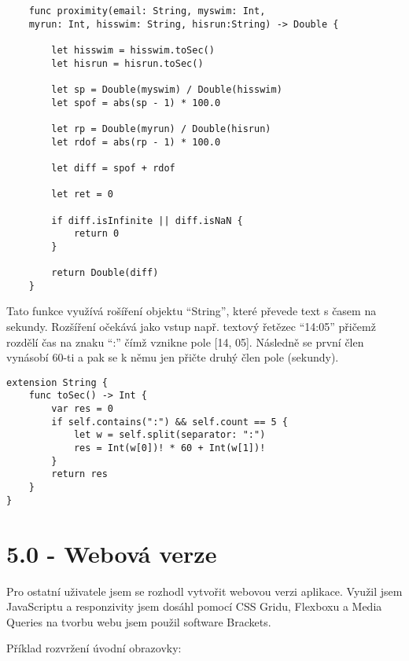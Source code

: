 \documentclass{article}
\begin{document}
\vspace{10 mm}
  \begin{verbatim}
    func proximity(email: String, myswim: Int,
    myrun: Int, hisswim: String, hisrun:String) -> Double {
        
        let hisswim = hisswim.toSec()
        let hisrun = hisrun.toSec()
        
        let sp = Double(myswim) / Double(hisswim)       
        let spof = abs(sp - 1) * 100.0
        
        let rp = Double(myrun) / Double(hisrun)
        let rdof = abs(rp - 1) * 100.0
        
        let diff = spof + rdof
        
        let ret = 0
        
        if diff.isInfinite || diff.isNaN {
            return 0
        }
        
        return Double(diff)
    }
 \end{verbatim}

\vspace{10 mm}
Tato funkce využívá rošíření objektu “String”, které převede text s časem na sekundy. Rozšíření očekává jako vstup např. textový řetězec “14:05” přičemž rozdělí čas na znaku “:” čímž vznikne pole [14, 05]. Následně se první člen vynásobí 60-ti a pak se k němu jen přičte druhý člen pole (sekundy).

\vspace{10 mm}

\begin{verbatim}
extension String {
    func toSec() -> Int {
        var res = 0
        if self.contains(":") && self.count == 5 {
            let w = self.split(separator: ":")
            res = Int(w[0])! * 60 + Int(w[1])!
        }
        return res
    }
}

\end{verbatim}



\vspace{20 mm}
\section*{5.0 - Webová verze}

Pro ostatní uživatele jsem se rozhodl vytvořit webovou verzi aplikace. Využil jsem JavaScriptu a responzivity jsem dosáhl pomocí CSS Gridu, Flexboxu a Media Queries na tvorbu webu jsem použil software Brackets. 


\hfill \break
Příklad rozvržení úvodní obrazovky:
\hfill \break
\end{document}
